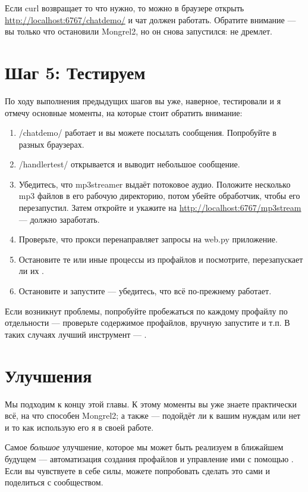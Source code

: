 Если curl возвращает то что нужно, то можно в браузере открыть
\url{http://localhost:6767/chatdemo/} и чат должен работать. Обратите внимание
--- вы только что остановили Mongrel2, но он снова запустился:  не
дремлет.

\section{Шаг 5: Тестируем}

По ходу выполнения предыдущих шагов вы уже, наверное, тестировали и я отмечу
основные моменты, на которые стоит обратить внимание:

\begin{enumerate}
\item /chatdemo/ работает и вы можете посылать сообщения. Попробуйте в разных
    браузерах.
\item /handlertest/ открывается и выводит небольшое сообщение.
\item Убедитесь, что mp3streamer выдаёт потоковое аудио. Положите несколько mp3
    файлов в его рабочую директорию, потом убейте обработчик, чтобы 
    его перезапустил. Затем откройте  и укажите на
    \url{http://localhost:6767/mp3stream} --- должно заработать.
\item Проверьте, что прокси перенаправляет запросы на web.py приложение.
\item Остановите те или иные процессы из профайлов и посмотрите, перезапускает
    ли их .
\item Остановите и запустите  --- убедитесь, что всё по-прежнему
    работает.
\end{enumerate}

Если возникнут проблемы, попробуйте пробежаться по каждому профайлу по
отдельности --- проверьте содержимое профайлов, вручную запустите и т.п. В таких
случаях лучший инструмент --- .

\section{Улучшения}

Мы подходим к концу этой главы. К этому моменты вы уже знаете практически всё,
на что способен Mongrel2; а также --- подойдёт ли  к вашим нуждам
или нет и то как использую его я в своей работе.

Самое \emph{большое} улучшение, которое мы может быть реализуем в ближайшем
будущем --- автоматизация создания профайлов и управление ими с помощью
. Если вы чувствуете в себе силы, можете попробовать сделать это
сами и поделиться с сообществом.

